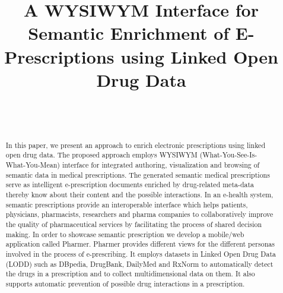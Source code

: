 \documentclass[journal]{IEEEtran}
\begin{document}
%
\title{A WYSIWYM Interface for Semantic Enrichment of E-Prescriptions using Linked Open Drug Data}

\author{
    \\
    \\
}




%

\maketitle


\begin{abstract}
In this paper, we present an approach to enrich electronic prescriptions using linked open drug data.
The proposed approach employs WYSIWYM (What-You-See-Is-What-You-Mean) interface for integrated authoring, visualization and browsing of semantic data in medical prescriptions.
The generated semantic medical prescriptions serve as intelligent e-prescription documents enriched by drug-related meta-data thereby know about their content and the possible interactions.
In an e-health system, semantic prescriptions provide an interoperable interface which helps patients, physicians, pharmacists, researchers and pharma companies to collaboratively improve the quality of pharmaceutical services by facilitating the process of shared decision making.
In order to showcase semantic prescription we develop a mobile/web application called Pharmer.
Pharmer provides different views for the different personas involved in the process of e-prescribing.
It employs datasets in Linked Open Drug Data (LODD) such as DBpedia, DrugBank, DailyMed and RxNorm to automatically detect the drugs in a prescription and to collect multidimensional data on them.
It also supports automatic prevention of possible drug interactions in a prescription.
\end{abstract}
\end{document}
